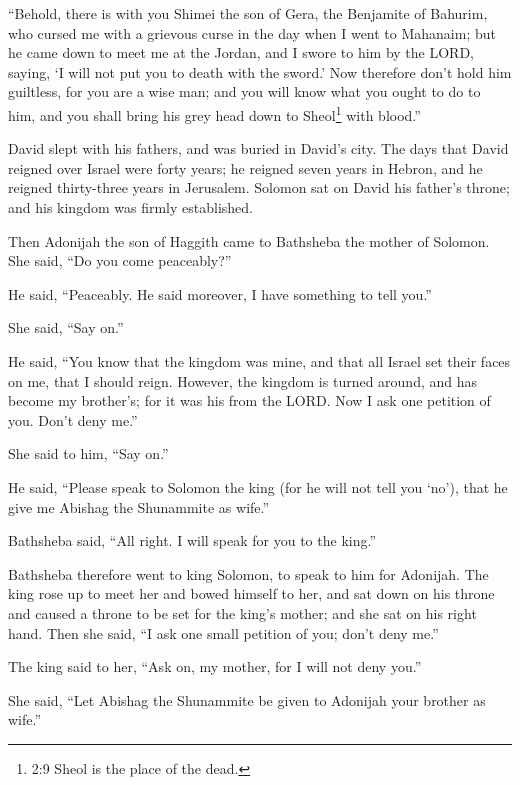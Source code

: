  ``Behold, there is with you Shimei the son of Gera, the
Benjamite of Bahurim, who cursed me with a grievous curse in the day
when I went to Mahanaim; but he came down to meet me at the Jordan, and
I swore to him by the LORD, saying, `I will not put you to death with
the sword.'  Now therefore don't hold him guiltless, for you
are a wise man; and you will know what you ought to do to him, and you
shall bring his grey head down to Sheol\footnote{2:9 Sheol is the place
  of the dead.} with blood.''

 David slept with his fathers, and was buried in David's
city.  The days that David reigned over Israel were forty
years; he reigned seven years in Hebron, and he reigned thirty-three
years in Jerusalem.  Solomon sat on David his father's
throne; and his kingdom was firmly established.

 Then Adonijah the son of Haggith came to Bathsheba the
mother of Solomon. She said, ``Do you come peaceably?''

He said, ``Peaceably.  He said moreover, I have something
to tell you.''

She said, ``Say on.''

 He said, ``You know that the kingdom was mine, and that
all Israel set their faces on me, that I should reign. However, the
kingdom is turned around, and has become my brother's; for it was his
from the LORD.  Now I ask one petition of you. Don't deny
me.''

She said to him, ``Say on.''

 He said, ``Please speak to Solomon the king (for he will
not tell you `no'), that he give me Abishag the Shunammite as wife.''

 Bathsheba said, ``All right. I will speak for you to the
king.''

 Bathsheba therefore went to king Solomon, to speak to him
for Adonijah. The king rose up to meet her and bowed himself to her, and
sat down on his throne and caused a throne to be set for the king's
mother; and she sat on his right hand.  Then she said, ``I
ask one small petition of you; don't deny me.''

The king said to her, ``Ask on, my mother, for I will not deny you.''

 She said, ``Let Abishag the Shunammite be given to
Adonijah your brother as wife.''

